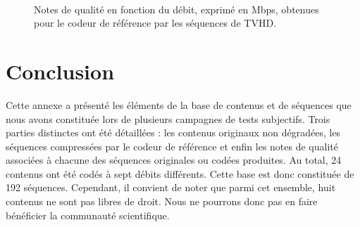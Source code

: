 \begin{figure}[htbp]
\\
\caption{Notes de qualité en fonction du débit, exprimé en Mbps, obtenues pour le codeur de référence \avc{} par les séquences de TVHD.}
\label{fig:MOSrateCodeurRefHD}
\end{figure}


\section{Conclusion}
Cette annexe a présenté les éléments de la base de contenus et de séquences que nous avons constituée lors de plusieurs campagnes de tests subjectifs. Trois parties distinctes ont été détaillées :  les contenus originaux non dégradées, les séquences compressées par le codeur de référence \avc{} et enfin les notes de qualité associées à chacune des séquences originales ou codées produites. Au total, 24 contenus ont été codés à sept débits différents. Cette base est donc constituée de 192 séquences. Cependant, il convient de noter que parmi cet ensemble, huit contenus ne sont pas libres de droit. Nous ne pourrons donc pas en faire bénéficier la communauté scientifique.


\ornementChapitre
